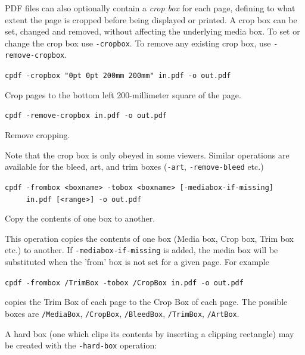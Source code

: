\documentclass{book}
\begin{document}
  PDF files can also optionally contain a \textit{crop box} for each page,
defining to what extent the page is cropped before being displayed or printed.
A crop box can be set, changed and removed, without affecting the underlying
media box. To set or change the crop box use \texttt{-cropbox}. To remove any
existing crop box, use \texttt{-remove-cropbox}.
  \begin{framed}
  \noindent\small\verb!cpdf -cropbox "0pt 0pt 200mm 200mm" in.pdf -o out.pdf!

  \vspace{2.5mm}
  \noindent Crop pages to the bottom left 200-millimeter square of the page.

  \vspace{2.5mm}
  \noindent\verb!cpdf -remove-cropbox in.pdf -o out.pdf!
  
  \vspace{2.5mm}
  \noindent Remove cropping.
  \end{framed}

\noindent Note that the crop box is only obeyed in some viewers. Similar operations are available for the bleed, art, and trim boxes (\texttt{-art}, \texttt{-remove-bleed} etc.)

  \begin{framed}
  \small\noindent\verb!cpdf -frombox <boxname> -tobox <boxname> [-mediabox-if-missing]! \\
  \noindent\verb!     in.pdf [<range>] -o out.pdf!

  \vspace{2.5mm}
  \noindent Copy the contents of one box to another.

  \end{framed}
  \noindent This operation copies the contents of one box (Media box, Crop box, Trim box etc.) to another. If \texttt{-mediabox-if-missing} is added, the media box will be substituted when the 'from' box is not set for a given page. For example

  \begin{framed}
    \noindent\small\verb!cpdf -frombox /TrimBox -tobox /CropBox in.pdf -o out.pdf!
  \end{framed}
  \noindent copies the Trim Box of each page to the Crop Box of each page. The possible boxes are \texttt{/MediaBox}, \texttt{/CropBox}, \texttt{/BleedBox}, \texttt{/TrimBox}, \texttt{/ArtBox}.\pagestyle{empty}\thispagestyle{fancy}

A hard box (one which clips its contents by inserting a clipping rectangle) may be created with the \texttt{-hard-box} operation:
\end{document}
